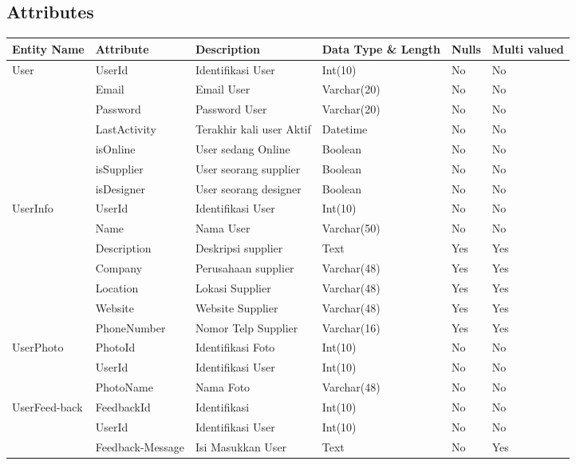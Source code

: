 \subsection{Attributes}
	\begin{longtable}{| p{2.2cm} | p{2.5cm} | p{3.4cm} | p{2.2cm} | l | p{1.3cm} |}
		\hline
		Entity Name & Attribute & Description & Data Type \& Length & Nulls & Multi valued \\
		\hline
		\noindent 
		User & 	UserId			& Identifikasi User			& Int(10)		& No & No \\
			 &	Email			& Email User				& Varchar(20)	& No & No \\
			 &	Password		& Password User				& Varchar(20)	& No & No \\
			 & 	LastActivity	& Terakhir kali user Aktif	& Datetime		& No & No \\
			 &	isOnline		& User sedang Online		& Boolean		& No & No \\
			 &	isSupplier		& User seorang supplier		& Boolean		& No & No \\
			 &	isDesigner		& User seorang designer		& Boolean		& No & No \\ \hline
			 
		UserInfo 	& UserId		& Identifikasi User		& Int(10)		& No  & No \\
					& Name			& Nama User				& Varchar(50)	& No  & No \\
					& Description	& Deskripsi supplier	& Text			& Yes & Yes \\
					& Company		& Perusahaan supplier	& Varchar(48)	& Yes & Yes \\
					& Location		& Lokasi Supplier		& Varchar(48)	& Yes & Yes \\
					& Website		& Website Supplier		& Varchar(48)	& Yes & Yes \\
					& PhoneNumber	& Nomor Telp Supplier	& Varchar(16)	& Yes & Yes \\ \hline
					
		UserPhoto	& PhotoId	& Identifikasi Foto	& Int(10)		& No & No \\
					& UserId	& Identifikasi User	& Int(10)		& No & No \\
					& PhotoName	& Nama Foto			& Varchar(48)	& No & No \\ \hline
					
		UserFeed-back	& FeedbackId		& Identifikasi		& Int(10) 	& No & No \\
						& UserId			& Identifikasi User	& Int(10) 	& No & No \\
						& Feedback-Message	& Isi Masukkan User	& Text		& No & Yes \\ \hline
						

\end{longtable}
